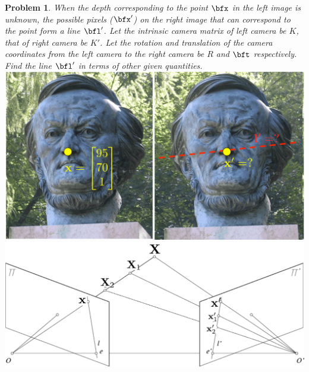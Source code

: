 \documentclass[times,singlecolumn]{article}
\newtheorem{prob}{Problem}
\begin{document}
\begin{prob}
  When the depth corresponding to the point $\bfx$ in the left image is unknown,
  the possible
  pixels ($\bfx'$) on the right image that can correspond to  the point form a
  line $\bfl'$. Let the intrinsic camera matrix of left camera be $K$, that of
  right camera be $K'$. Let the rotation and translation of the camera
coordinates from the left camera to the right camera be $R$ and $\bft$
respectively. Find the line $\bfl'$  in terms of other given quantities.
  \\
  \includegraphics[width=0.5\linewidth]{media/stereo-images.png.pdf}\includegraphics[width=0.5\linewidth]{media/epipolar-constraint.png.pdf}
\end{prob}
\end{document}
